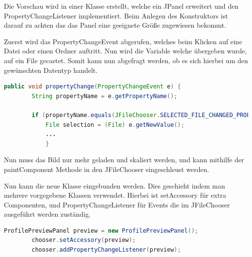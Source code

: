 Die Vorschau wird in einer Klasse erstellt, welche ein JPanel erweitert und den PropertyChangeListener implementiert. Beim Anlegen des Konstruktors ist darauf zu achten das das Panel eine geeignete Größe zugewiesen bekommt.

Zuerst wird das PropertyChangeEvent abgerufen, welches beim Klicken auf eine Datei oder einen Ordner auftritt. Nun wird die Variable welche übergeben wurde, auf ein File gecastet. Somit kann nun abgefragt werden, ob es sich hierbei um den gewünschten Datentyp handelt. 
\begin{lstlisting}[language=JAVA]
	public void propertyChange(PropertyChangeEvent e) {
		String propertyName = e.getPropertyName();

		if (propertyName.equals(JFileChooser.SELECTED_FILE_CHANGED_PROPERTY)) {
			File selection = (File) e.getNewValue();
			...
			}
\end{lstlisting}

Nun muss das Bild nur mehr geladen und skaliert werden, und kann mithilfe der paintComponent Methode in den JFileChooser eingeschleust werden.

Nun kann die neue Klasse eingebunden werden. Dies geschieht indem man mehrere vorgegebene Klassen verwendet. Hierbei ist setAccessory für extra Componenten, und PropertyChangeListener für Events die im JFileChooser ausgeführt werden zuständig.
\begin{lstlisting}[language=JAVA]
		ProfilePreviewPanel preview = new ProfilePreviewPanel();
		chooser.setAccessory(preview);
		chooser.addPropertyChangeListener(preview);
\end{lstlisting}